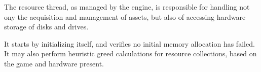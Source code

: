 The resource thread, as managed by the engine, is responsible for handling not ony the acquisition and management of assets, but also of accessing hardware storage of disks and drives.

It starts by initializing itself, and verifies no initial memory allocation has failed. It may also perform heuristic greed calculations for resource collections, based on the game and hardware present.
